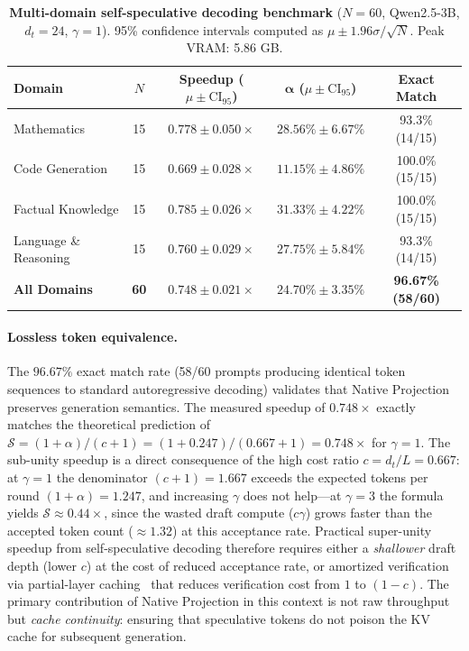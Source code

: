 \documentclass{article}
\newcommand{\dt}{d_t}
\begin{document}
\begin{table}[t]
\centering
\caption{\textbf{Multi-domain self-speculative decoding benchmark} ($N{=}60$, Qwen2.5-3B, $\dt{=}24$, $\gamma{=}1$). 95\% confidence intervals computed as $\mu \pm 1.96\sigma/\sqrt{N}$. Peak VRAM: 5.86 GB.}
\label{tab:speculative}
\small
\begin{tabular}{@{}lcccc@{}}
\toprule
\textbf{Domain} & $N$ & \textbf{Speedup} ($\mu \pm \text{CI}_{95}$) & $\boldsymbol{\alpha}$ ($\mu \pm \text{CI}_{95}$) & \textbf{Exact Match} \\
\midrule
Mathematics & 15 & $0.778 \pm 0.050\times$ & $28.56\% \pm 6.67\%$ & 93.3\% (14/15) \\
Code Generation & 15 & $0.669 \pm 0.028\times$ & $11.15\% \pm 4.86\%$ & 100.0\% (15/15) \\
Factual Knowledge & 15 & $0.785 \pm 0.026\times$ & $31.33\% \pm 4.22\%$ & 100.0\% (15/15) \\
Language \& Reasoning & 15 & $0.760 \pm 0.029\times$ & $27.75\% \pm 5.84\%$ & 93.3\% (14/15) \\
\midrule
\textbf{All Domains} & \textbf{60} & $\mathbf{0.748 \pm 0.021\times}$ & $\mathbf{24.70\% \pm 3.35\%}$ & \textbf{96.67\% (58/60)} \\
\bottomrule
\end{tabular}
\end{table}

\paragraph{Lossless token equivalence.}
The $96.67\%$ exact match rate (58/60 prompts producing identical token sequences to standard autoregressive decoding) validates that Native Projection preserves generation semantics. The measured speedup of $0.748\times$ exactly matches the theoretical prediction of $\mathcal{S} = (1+\alpha)/(c+1) = (1+0.247)/(0.667+1) = 0.748\times$ for $\gamma{=}1$. The sub-unity speedup is a direct consequence of the high cost ratio $c = \dt/L = 0.667$: at $\gamma{=}1$ the denominator $(c + 1) = 1.667$ exceeds the expected tokens per round $(1+\alpha) = 1.247$, and increasing $\gamma$ does not help---at $\gamma{=}3$ the formula yields $\mathcal{S} \approx 0.44\times$, since the wasted draft compute ($c\gamma$) grows faster than the accepted token count ($\approx 1.32$) at this acceptance rate. Practical super-unity speedup from self-speculative decoding therefore requires either a \emph{shallower} draft depth (lower $c$) at the cost of reduced acceptance rate, or amortized verification via partial-layer caching~\cite{elhoushi2024layerskip} that reduces verification cost from $1$ to $(1{-}c)$. The primary contribution of Native Projection in this context is not raw throughput but \emph{cache continuity}: ensuring that speculative tokens do not poison the KV cache for subsequent generation.
\end{document}
